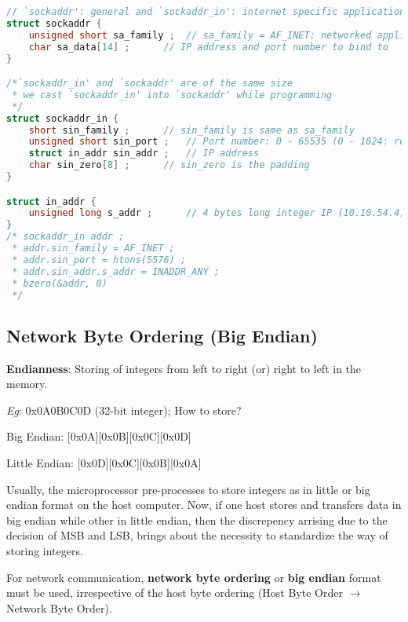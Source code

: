 \documentclass[10pt]{article}
\begin{document}
\begin{lstlisting}[language=C]
// `sockaddr': general and `sockaddr_in': internet specific applications
struct sockaddr {
	unsigned short sa_family ;	// sa_family = AF_INET: networked applications
	char sa_data[14] ;		// IP address and port number to bind to
}

/*`sockaddr_in' and `sockaddr' are of the same size
 * we cast `sockaddr_in' into `sockaddr' while programming
 */
struct sockaddr_in {
	short sin_family ;		// sin_family is same as sa_family
	unsigned short sin_port ; 	// Port number: 0 - 65535 (0 - 1024: reserved)
	struct in_addr sin_addr ;	// IP address
	char sin_zero[8] ;		// sin_zero is the padding
}

struct in_addr {
	unsigned long s_addr ;		// 4 bytes long integer IP (10.10.54.4)
}
/* sockaddr_in addr ;
 * addr.sin_family = AF_INET ;
 * addr.sin_port = htons(5576) ;
 * addr.sin_addr.s_addr = INADDR_ANY ;
 * bzero(&addr, 0)
 */
\end{lstlisting}

\subsection{Network Byte Ordering (Big Endian)}
\textbf{Endianness}: Storing of integers from left to right (or) right to left in the memory.
\par
\textit{Eg}: 0x0A0B0C0D (32-bit integer); How to store? \par
Big Endian: [0x0A][0x0B][0x0C][0x0D] \par
Little Endian: [0x0D][0x0C][0x0B][0x0A] \par
\vspace{5mm}
Usually, the microprocessor pre-processes to store integers as in little or big endian format on the host computer. Now, if one host stores and transfers data in big endian while other in little endian, then the discrepency arrising due to the decision of MSB and LSB, brings about the necessity to standardize the way of storing integers. \par 

For network communication, \textbf{network byte ordering} or \textbf{big endian} format must be used, irrespective of the host byte ordering (Host Byte Order $\rightarrow$ Network Byte Order).
\end{document}

